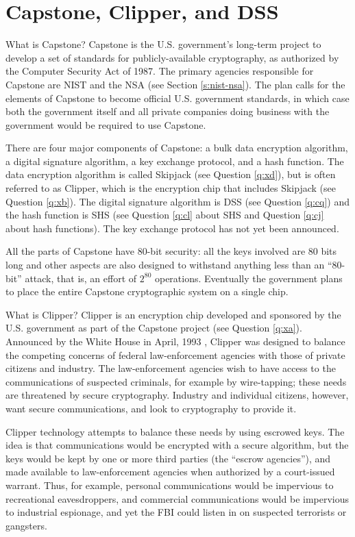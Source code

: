 \section {Capstone, Clipper, and DSS} \label{sec:cap}
{What is Capstone?}
Capstone is the U.S. government's long-term project to develop a set
of standards for publicly-available cryptography, as authorized by 
the Computer Security Act of 1987. The primary agencies responsible 
for Capstone are NIST and the NSA (see Section \ref{s:nist-nsa}).
The plan calls for the elements of Capstone to become official U.S. 
government standards, in which case both the government itself and
all private companies doing business with the government would
be required to use Capstone.

There are four major components of Capstone: a bulk data encryption
algorithm, a digital signature algorithm, a key exchange protocol, and
a hash function. The data encryption algorithm is called Skipjack
(see Question \ref{q:xd}), but is often referred to as Clipper, which
is the encryption chip that includes Skipjack (see Question \ref{q:xb}).
The digital signature algorithm is DSS (see Question \ref{q:cq}) and 
the hash function is SHS (see Question \ref{q:cl} about SHS and
Question \ref{q:cj} about hash functions). The key exchange 
protocol has not yet been announced. 

All the parts of Capstone have 80-bit security: all the keys involved
are 80 bits long and other aspects are also designed to withstand 
anything less than an ``80-bit'' attack, that is, an effort of $2^{80}$ 
operations. Eventually the government plans to place the entire Capstone 
cryptographic system on a single chip.

{What is Clipper?}
Clipper is an encryption chip developed and sponsored by the U.S. 
government as part of the Capstone project (see Question \ref{q:xa}).
Announced by the White House in April, 1993 \cite{office-clipper-press},
Clipper was designed to balance the competing concerns of federal
law-enforcement agencies with those of private citizens and industry. 
The law-enforcement agencies wish to have access to the communications 
of suspected criminals, for example by wire-tapping; these needs are
threatened by secure cryptography. Industry and individual
citizens, however, want secure communications, and look to cryptography
to provide it.

Clipper technology attempts to balance these needs by using escrowed
keys. The idea is that communications would be encrypted with a 
secure algorithm, but the keys would be kept by one or more third 
parties (the ``escrow agencies''), and made available to law-enforcement 
agencies when authorized by a court-issued warrant. Thus, for 
example, personal communications would be impervious to recreational 
eavesdroppers, and commercial communications would be impervious to 
industrial espionage, and yet the FBI could listen in on suspected 
terrorists or gangsters. 

